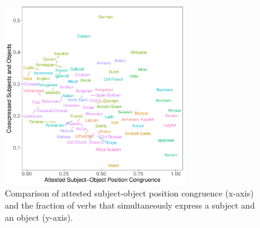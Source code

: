 \documentclass[11pt,a4paper]{article}
\begin{document}
\begin{figure}
    \centering
    \includegraphics[width=0.7\textwidth]{../analysis/figures/objects-order-pureud-byVerb_FORMAT.pdf}
    \caption{Comparison of attested subject-object position congruence (x-axis) and the fraction of verbs that simultaneously express a subject and an object (y-axis).}
    \label{fig:study2}
\end{figure}













\end{document}
